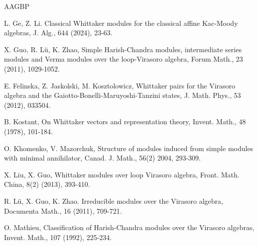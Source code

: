 \documentclass[12pt, a4paper]{amsart}
\theoremstyle{Theorem}
\theoremstyle{Theorem}
\numberwithin{equation}{section}
\begin{document}
\begin{thebibliography}{AAGBP}


L. Ge, Z. Li. Classical Whittaker modules for the classical affine Kac-Moody algebras, J. Alg., 644 (2024), 23-63.


X. Guo, R. L\"{u}, K. Zhao, Simple Harish-Chandra modules, intermediate series modules
and Verma modules over the loop-Virasoro algebra, Forum Math., 23 (2011), 1029-1052.


E. Felinska, Z. Jaskolski, M. Kosztolowicz, Whittaker pairs for the Virasoro algebra and the
Gaiotto-Bonelli-Maruyoshi-Tanzini states, J. Math. Phys., 53 (2012), 033504.









B. Kostant, On Whittaker vectors and representation theory, Invent. Math., 48 (1978), 101-184.

O. Khomenko, V. Mazorchuk, Structure of modules induced from simple modules with
minimal annihilator, Canad. J. Math., 56(2) 2004, 293-309.


X. Liu, X. Guo, Whittaker modules over loop Virasoro algebra, Front. Math. China, 8(2) (2013), 393-410.

R. L\"{u}, X. Guo, K. Zhao. Irreducible modules over the Virasoro algebra, Documenta Math., 16 (2011), 709-721.






O. Mathieu, Classification of Harish-Chandra modules over the Virasoro algebras,
Invent. Math., 107 (1992), 225-234.




\end{thebibliography}
\end{document}

